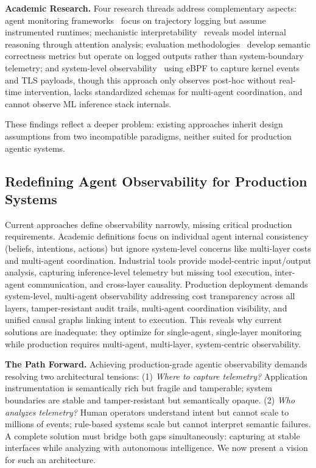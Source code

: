 \documentclass[sigplan,screen,9pt]{acmart}
\begin{document}
\textbf{Academic Research.} Four research threads address complementary aspects: agent monitoring frameworks~\cite{Rombaut2025Watson,Dong2024AgentOps} focus on trajectory logging but assume instrumented runtimes; mechanistic interpretability~\cite{Kim2025AgenticInterp} reveals model internal reasoning through attention analysis; evaluation methodologies~\cite{Moshkovich2025Pipeline} develop semantic correctness metrics but operate on logged outputs rather than system-boundary telemetry; and system-level observability~\cite{zheng2025agentsight} using eBPF to capture kernel events and TLS payloads, though this approach only observes post-hoc without real-time intervention, lacks standardized schemas for multi-agent coordination, and cannot observe ML inference stack internals.

These findings reflect a deeper problem: existing approaches inherit design assumptions from two incompatible paradigms, neither suited for production agentic systems.

\subsection{Redefining Agent Observability for Production Systems}

Current approaches define observability narrowly, missing critical production requirements. Academic definitions focus on individual agent internal consistency (beliefs, intentions, actions) but ignore system-level concerns like multi-layer costs and multi-agent coordination. Industrial tools provide model-centric input/output analysis, capturing inference-level telemetry but missing tool execution, inter-agent communication, and cross-layer causality. Production deployment demands system-level, multi-agent observability addressing cost transparency across all layers, tamper-resistant audit trails, multi-agent coordination visibility, and unified causal graphs linking intent to execution. This reveals why current solutions are inadequate: they optimize for single-agent, single-layer monitoring while production requires multi-agent, multi-layer, system-centric observability.

\textbf{The Path Forward.} Achieving production-grade agentic observability demands resolving two architectural tensions: (1) \emph{Where to capture telemetry?} Application instrumentation is semantically rich but fragile and tamperable; system boundaries are stable and tamper-resistant but semantically opaque. (2) \emph{Who analyzes telemetry?} Human operators understand intent but cannot scale to millions of events; rule-based systems scale but cannot interpret semantic failures. A complete solution must bridge both gaps simultaneously: capturing at stable interfaces while analyzing with autonomous intelligence. We now present a vision for such an architecture.
\end{document}
